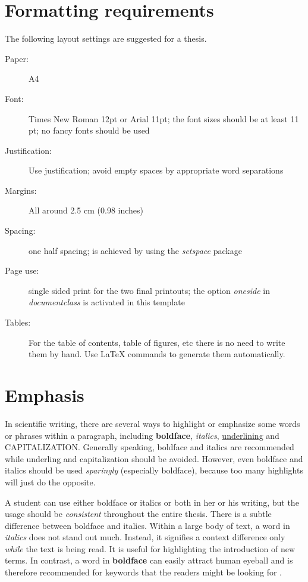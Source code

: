 \section{Formatting requirements}

The following layout settings are suggested for a thesis.
\begin{description}
\item[Paper:] A4
\item[Font:] Times New Roman 12pt or Arial 11pt; the font sizes should be at least 11 pt; no fancy fonts should be used
\item[Justification:] Use justification; avoid empty spaces by appropriate word separations
\item[Margins:] All around 2.5 cm (0.98 inches)
\item[Spacing:] one half spacing; is achieved by using the \textit{setspace} package 
\item[Page use:] single sided print for the two final printouts; the option \textit{oneside} in \textit{documentclass} is activated in this template 
\item[Tables:] For the table of contents, table of figures, etc there is no need to write them by hand. Use LaTeX commands to generate them automatically.
\end{description}

\section{Emphasis}

In scientific writing, there are several ways to highlight or emphasize some words or phrases within a paragraph, including \textbf{boldface}, \textit{italics}, \underline{underlining} and CAPITALIZATION. Generally speaking, boldface and italics are recommended while underling and capitalization should be avoided. However, even boldface and italics should be used \textit{sparingly} (especially boldface), because too many highlights will just do the opposite.

A student can use either boldface or italics or both in her or his writing, but the usage should be \textit{consistent} throughout the entire thesis. There is a subtle difference between boldface and italics. Within a large body of text, a word in \textit{italics} does not stand out much. Instead, it signifies a context difference only \textit{while} the text is being read. It is useful for highlighting the introduction of new terms. In contrast, a word in \textbf{boldface} can easily attract human eyeball and is therefore recommended for keywords that the readers might be looking for \cite{wik13a}.


